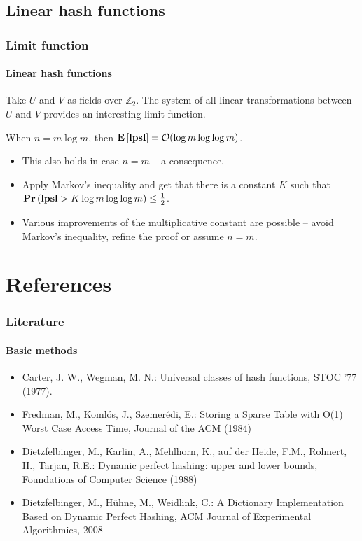 \subsection{Linear hash functions}
\begin{frame}
	\frametitle{Limit function}
	\framesubtitle{Linear hash functions}
	
	Take $U$ and $V$ as fields over $\mathbb{Z}_2$. The system of all linear transformations between $U$ and $V$ provides an interesting limit function.

	\begin{theorem}
		When $n = m \log m$, then $\mathbf{E}\left[\mathbf{lpsl}\right] = \mathcal{O}(\log m \log \log m)$.
	\end{theorem}
	
	\begin{itemize}
		\item This also holds in case $n = m$ -- a consequence.
		\item Apply Markov's inequality and get that there is a constant $K$ such that $\mathbf{Pr}\left(\mathbf{lpsl} > K \log m \log \log m\right) \leq \frac{1}{2}$.
		\item Various improvements of the multiplicative constant are possible -- avoid Markov's inequality, refine the proof or assume $n = m$.
	\end{itemize}
\end{frame}

\section*{References}
\begin{frame}
	\frametitle{Literature}
	\framesubtitle{Basic methods}
	
	\begin{itemize}	
		\item Carter, J. W., Wegman, M. N.: Universal classes of hash functions, STOC '77 (1977).
		\item Fredman, M., Komlós, J., Szemerédi, E.: Storing a Sparse Table with O(1) Worst Case Access Time, Journal of the ACM (1984)
		\item Dietzfelbinger, M., Karlin, A., Mehlhorn, K., auf der Heide, F.M., Rohnert, H., Tarjan, R.E.: Dynamic perfect hashing: upper and lower bounds, Foundations of Computer Science (1988)
		\item Dietzfelbinger, M., Hühne, M., Weidlink, C.: A Dictionary Implementation Based on Dynamic Perfect Hashing, ACM Journal of Experimental Algorithmics, 2008
	\end{itemize}
\end{frame}

